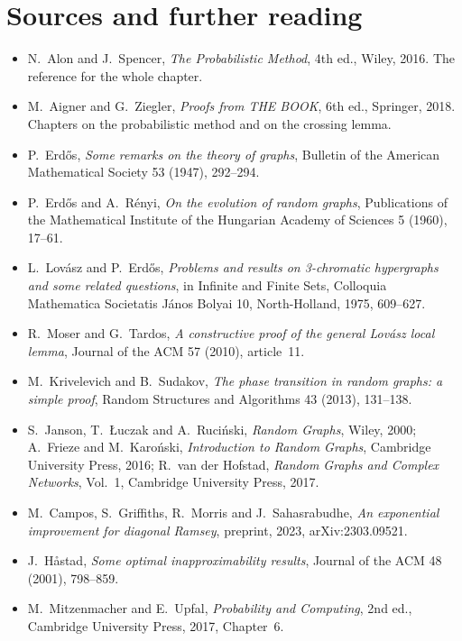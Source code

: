 \section*{Sources and further reading}

\begin{itemize}
\item N.~Alon and J.~Spencer, \emph{The Probabilistic Method}, 4th ed., Wiley, 2016. The reference for the whole chapter.
\item M.~Aigner and G.~Ziegler, \emph{Proofs from THE BOOK}, 6th ed., Springer, 2018. Chapters on the probabilistic method and
on the crossing lemma.
\item P.~Erd\H os, \emph{Some remarks on the theory of graphs}, Bulletin of the American Mathematical Society 53 (1947),
292--294.
\item P.~Erd\H os and A.~R\'enyi, \emph{On the evolution of random graphs}, Publications of the Mathematical Institute of the
Hungarian Academy of Sciences 5 (1960), 17--61.
\item L.~Lov\'asz and P.~Erd\H os, \emph{Problems and results on 3-chromatic hypergraphs and some related questions}, in
Infinite and Finite Sets, Colloquia Mathematica Societatis J\'anos Bolyai 10, North-Holland, 1975, 609--627.
\item R.~Moser and G.~Tardos, \emph{A constructive proof of the general Lov\'asz local lemma}, Journal of the ACM 57 (2010),
article~11.
\item M.~Krivelevich and B.~Sudakov, \emph{The phase transition in random graphs: a simple proof}, Random Structures and
Algorithms 43 (2013), 131--138.
\item S.~Janson, T.~\L uczak and A.~Ruci\'nski, \emph{Random Graphs}, Wiley, 2000; A.~Frieze and M.~Karo\'nski, \emph{Introduction to
Random Graphs}, Cambridge University Press, 2016; R.~van der Hofstad, \emph{Random Graphs and Complex Networks}, Vol.~1,
Cambridge University Press, 2017.
\item M.~Campos, S.~Griffiths, R.~Morris and J.~Sahasrabudhe, \emph{An exponential improvement for diagonal Ramsey},
preprint, 2023, arXiv:2303.09521.
\item J.~H\aa stad, \emph{Some optimal inapproximability results}, Journal of the ACM 48 (2001), 798--859.
\item M.~Mitzenmacher and E.~Upfal, \emph{Probability and Computing}, 2nd ed., Cambridge University Press, 2017, Chapter~6.
\end{itemize}
